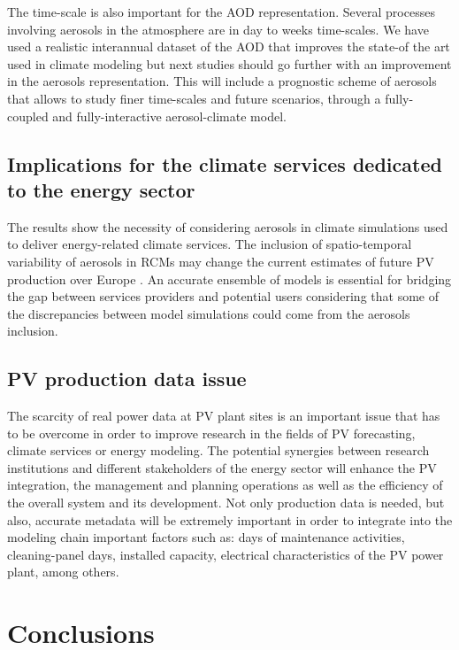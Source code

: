 The time-scale is also important for the AOD representation. Several processes involving aerosols in the atmosphere are in day to weeks time-scales. We have used a realistic interannual dataset of the AOD that improves the state-of the art used in climate modeling but next studies should go further with an improvement in the aerosols representation. This will include a prognostic scheme of aerosols that allows to study finer time-scales and future scenarios, through a fully-coupled and fully-interactive aerosol-climate model. 
  

\subsection{Implications for the climate services dedicated to the energy sector }

The results show the necessity of considering aerosols in climate simulations used to deliver energy-related climate services. The inclusion of spatio-temporal variability of aerosols in RCMs may change the current estimates of future PV production over Europe \citep{Jerez2015}. An accurate ensemble of models is essential for bridging the gap between services providers and potential users considering that some of the discrepancies between model simulations could come from the aerosols inclusion.

\subsection{PV production data issue}

The scarcity of real power data at PV plant sites is an important issue that has to be overcome in order to improve research in the fields of PV forecasting, climate services or energy modeling. The potential synergies between research institutions and different stakeholders of the energy sector will enhance the PV integration, the management and planning operations as well as the efficiency of the overall system and its development. Not only production data is needed, but also, accurate metadata will be extremely important in order to integrate into the modeling chain important factors such as: days of maintenance activities, cleaning-panel days, installed capacity, electrical characteristics of the PV power plant, among others.

\section{Conclusions}

